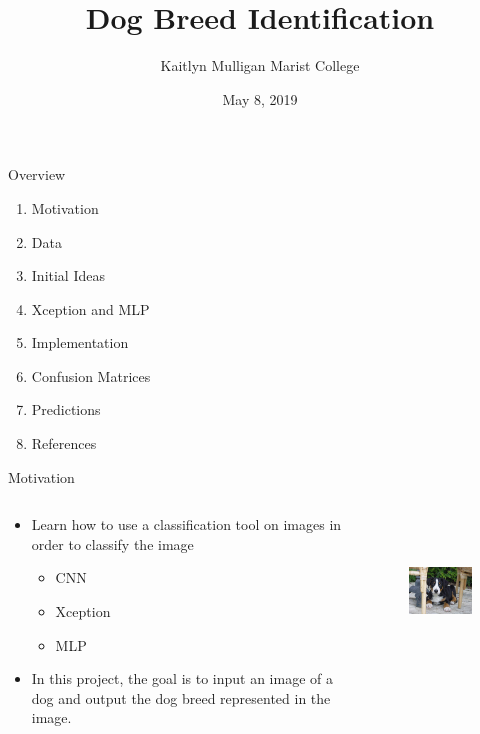 \documentclass[leqno]{beamer}
\title{Dog Breed Identification}
\author{Kaitlyn Mulligan\hspace*{.1in} \newline Marist College \hspace*{.1in}}
\date{May 8, 2019}
\begin{document}
\begin{frame}
    \titlepage
\end{frame}

\begin{frame}{Overview}
    \begin{enumerate}
        \item Motivation
        \item Data
        \item Initial Ideas
        \item Xception and MLP
        \item Implementation
        \item Confusion Matrices
        \item Predictions
        \item References
    \end{enumerate}
\end{frame}

\begin{frame}{Motivation}
    \begin{columns}
        \begin{column}{0.45\textwidth}
            \begin{itemize}
                \item Learn how to use a classification tool on images in order to 
                classify the image
                \begin{itemize}
                    \item CNN
                    \item Xception
                    \item MLP
                \end{itemize}
                \item In this project, the goal is to input an image of a dog and 
                output the dog breed represented in the image.
            \end{itemize}
        \end{column}
        \begin{column}{0.45\textwidth}
            \begin{figure}
                \includegraphics[height=4cm]{dog3.jpg}
            \end{figure}
        \end{column}
    \end{columns}
\end{frame}
\end{document}

